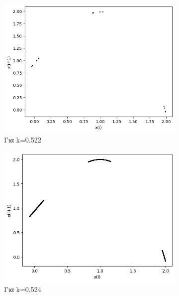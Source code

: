 \begin{figure}[h!]
	\centering
	\begin{subfigure}[c]{0.4\textwidth}
		\centering
		\includegraphics[width=\textwidth]{LateX images/graphs/k0522}
		\caption{Για k=0.522}
		\label{f:k8}
	\end{subfigure}
	\hfill
	\begin{subfigure}[c]{0.4\textwidth}
		\centering
		\includegraphics[width=\textwidth]{LateX images/graphs/k0524}
		\caption{Για k=0.524}
		\label{f:k9}
	\end{subfigure}
	\hfill
	\begin{subfigure}[c]{0.4\textwidth}
		\centering

\end{subfigure}
\end{figure}
